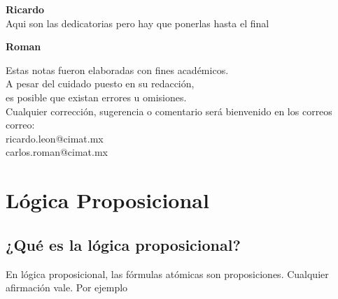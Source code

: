 \message{ !name(main.tex)}\documentclass[12pt,a4paper]{book}
\begin{document}



    \thispagestyle{empty}
    

    \begin{flushright}
      \thispagestyle{empty}

        \textbf{Ricardo}\\[0.3cm]

        Aqui son las dedicatorias pero hay que ponerlas hasta el final

        \textbf{Roman}
    \end{flushright}


    \cleardoublepage
    \thispagestyle{empty}

    \begin{mdframed}[style=mdgreenbox]
        \begin{center}
        \small
        Estas notas fueron elaboradas con fines académicos.\\
        A pesar del cuidado puesto en su redacción,\\
        es posible que existan errores u omisiones.\\[0.3cm]

        Cualquier corrección, sugerencia o comentario será bienvenido
        en los correos correo: \\[0.3cm]

        ricardo.leon@cimat.mx\\
        carlos.roman@cimat.mx
        \end{center}
    \end{mdframed}


    \setcounter{page}{1}
    \tableofcontents

    \chapter{Lógica Proposicional}

    \section{¿Qué es la lógica proposicional?}

    En lógica proposicional, las fórmulas atómicas son proposiciones. Cualquier afirmación vale. Por ejemplo
\end{document}
